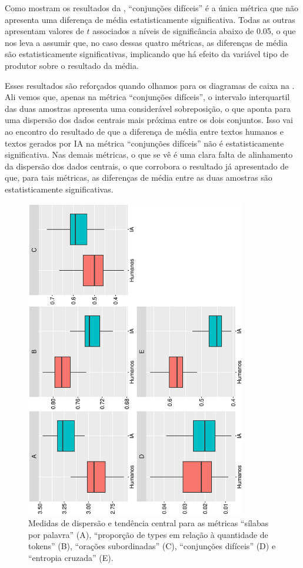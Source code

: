 \documentclass[portuguese]{textolivre}
\begin{document}
Como mostram os resultados da , ``conjunções difíceis'' é a única métrica que não apresenta uma diferença de média estatisticamente significativa.
Todas as outras apresentam valores de $t$ associados a níveis de significância abaixo de 0.05, o que nos leva a assumir que, no caso dessas quatro métricas, as diferenças de média são estatisticamente significativas, implicando que há efeito da variável tipo de produtor sobre o resultado da média.

Esses resultados são reforçados quando olhamos para os diagramas de caixa na .
Ali vemos que, apenas na métrica ``conjunções difíceis'', o intervalo interquartil das duas amostras apresenta uma considerável sobreposição, o que aponta para uma dispersão dos dados centrais mais próxima entre os dois conjuntos.
Isso vai ao encontro do resultado de que a diferença de média entre textos humanos e textos gerados por IA na métrica ``conjunções difíceis'' não é estatisticamente significativa.
Nas demais métricas, o que se vê é uma clara falta de alinhamento da dispersão dos dados centrais, o que corrobora o resultado já apresentado de que, para tais métricas, as diferenças de média entre as duas amostras são estatisticamente significativas.

\begin{figure}[htbp]
\centering
\begin{minipage}{1\textwidth}
\centering
  \includegraphics[width=.5\linewidth, height=14cm, angle=270]{figura_01.ps}
 \caption{Medidas de dispersão e tendência central para as métricas ``sílabas por palavra'' (A), ``proporção de types em relação à quantidade de tokens'' (B), ``orações subordinadas'' (C), ``conjunções difíceis'' (D) e ``entropia cruzada'' (E).}
 \label{fig-img-01}
\end{minipage}
\end{figure}
\end{document}
